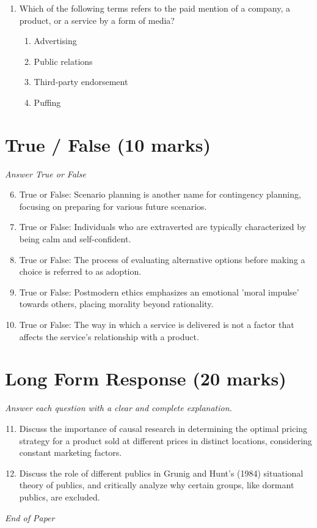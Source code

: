 \documentclass[12pt]{article}
\begin{document}
\begin{enumerate}[label=\arabic*.]
\begin{enumerate}[label=(\alph*)]
    \item Research and evaluation
    \item Strategy and evaluation
    \item Strategy and implementation
    \item Objectives and implementation
\end{enumerate}
\item Which of the following terms refers to the paid mention of a company, a product, or a service by a form of media?
\begin{enumerate}[label=(\alph*)]
    \item Advertising
    \item Public relations
    \item Third-party endorsement
    \item Puffing
\end{enumerate}
\end{enumerate}

\section*{True / False (10 marks)}
\textit{Answer True or False}
\begin{enumerate}[label=\arabic*.]
\setcounter{enumi}{5}
\item True or False: Scenario planning is another name for contingency planning, focusing on preparing for various future scenarios.
\item True or False: Individuals who are extraverted are typically characterized by being calm and self-confident.
\item True or False: The process of evaluating alternative options before making a choice is referred to as adoption.
\item True or False: Postmodern ethics emphasizes an emotional 'moral impulse' towards others, placing morality beyond rationality.
\item True or False: The way in which a service is delivered is not a factor that affects the service's relationship with a product.
\end{enumerate}

\section*{Long Form Response (20 marks)}
\textit{Answer each question with a clear and complete explanation.}
\begin{enumerate}[label=\arabic*.]
\setcounter{enumi}{10}
\item Discuss the importance of causal research in determining the optimal pricing strategy for a product sold at different prices in distinct locations, considering constant marketing factors.
\item Discuss the role of different publics in Grunig and Hunt's (1984) situational theory of publics, and critically analyze why certain groups, like dormant publics, are excluded.
\end{enumerate}

\vfill
\noindent\textit{End of Paper}
\end{document}
